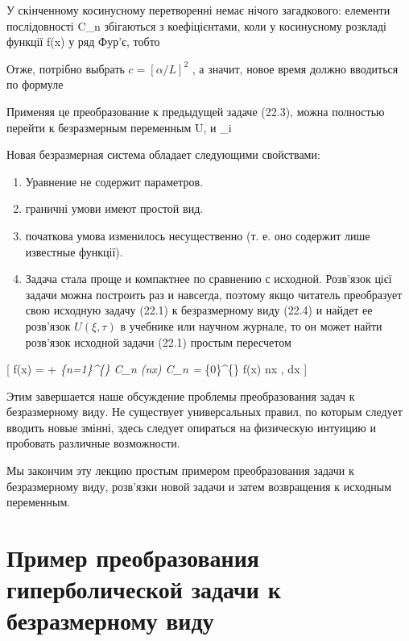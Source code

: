 \documentclass[
  ukrainian,
]{article}
\begin{document}
У скінченному косинусному перетворенні немає нічого загадкового:
елементи послідовності C\_n збігаються з коефіцієнтами, коли 
у косинусному розкладі функції f(x) у ряд Фур'є, тобто

Отже, потрібно выбрать \(c = [\alpha/L]^2\) , а значит, новое время
должно вводиться по формуле

Применяя це преобразование к предыдущей задаче (22.3), можна полностью
перейти к безразмерным переменным U, \xi  и \tau\_i

Новая безразмерная система обладает следующими свойствами:

\begin{enumerate}
\def\labelenumi{\arabic{enumi}.}
\item
  Уравнение не содержит параметров.
\item
  граничні умови имеют простой вид.
\item
  початкова умова изменилось несущественно (т. е. оно содержит лише
  известные функції).
\item
  Задача стала проще и компактнее по сравнению с исходной. Розв'язок
  цієї задачи можна построить раз и навсегда, поэтому якщо читатель
  преобразует свою исходную задачу (22.1) к безразмерному виду (22.4) и
  найдет ее розв'язок \(U(\xi, \tau)\) в учебнике или научном журнале,
  то он может найти розв'язок исходной задачи (22.1) простым пересчетом
\end{enumerate}

{[} f(x) =  + \sum\emph{\{n=1\}\^{}\{\infty\} C\_n \cos(nx)
\qquad C\_n =  \int}\{0\}\^{}\{\pi\} f(x) \cos nx , dx {]}

Этим завершается наше обсуждение проблемы преобразования задач к
безразмерному виду. Не существует универсальных правил, по которым
следует вводить новые змінні, здесь следует опираться на физическую
интуицию и пробовать различные возможности.

Мы закончим эту лекцию простым примером преобразования задачи к
безразмерному виду, розв'язки новой задачи и затем возвращения к
исходным переменным.

\section{Пример преобразования гиперболической задачи к безразмерному
виду}\label{ux43fux440ux438ux43cux435ux440-ux43fux440ux435ux43eux431ux440ux430ux437ux43eux432ux430ux43dux438ux44f-ux433ux438ux43fux435ux440ux431ux43eux43bux438ux447ux435ux441ux43aux43eux439-ux437ux430ux434ux430ux447ux438-ux43a-ux431ux435ux437ux440ux430ux437ux43cux435ux440ux43dux43eux43cux443-ux432ux438ux434ux443}
\end{document}

